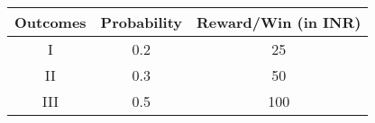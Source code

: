 \begin{tabular}{|c|c|c|}
\hline
\textbf{Outcomes} & \textbf{Probability} & \textbf{Reward/Win (in INR)} \\
\hline
I   & 0.2 & 25 \\
\hline
II  & 0.3 & 50 \\
\hline
III & 0.5 & 100 \\
\hline
\end{tabular}
